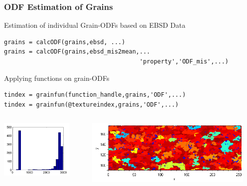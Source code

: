 \begin{frame}[fragile]
\end{frame}


\begin{frame}[fragile]
  \frametitle{ODF Estimation of Grains}

Estimation of individual Grain-ODFs based on EBSD Data
\begin{lstlisting}
grains = calcODF(grains,ebsd, ...)
grains = calcODF(grains,ebsd_mis2mean,...
									  'property','ODF_mis',...)
\end{lstlisting}

Applying functions on grain-ODFs
\begin{lstlisting}
tindex = grainfun(function_handle,grains,'ODF',...)
tindex = grainfun(@textureindex,grains,'ODF',...)
\end{lstlisting}

\begin{columns}
\begin{column}[T]{3.5cm}
\includegraphics[width=3.5cm]{pic/grtindxhist}
\end{column}
\begin{column}[T]{8cm}
\includegraphics[width=8cm]{pic/grtindx}
\end{column}
\end{columns}

\end{frame}



